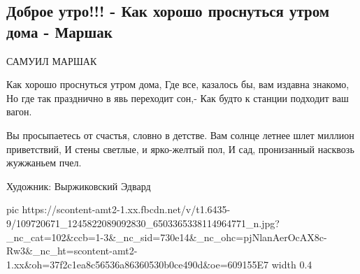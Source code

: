  
 
 
 
 

\subsection{Доброе утро!!! - Как хорошо проснуться утром дома - Маршак}
\label{sec:20_07_2020.fb.maslov_evgenij.1.marshak_dom_stihi}

САМУИЛ МАРШАК 

Как хорошо проснуться утром дома, 
Где все, казалось бы, вам издавна знакомо, 
Но где так празднично в явь переходит сон,- 
Как будто к станции подходит ваш вагон. 

Вы просыпаетесь от счастья, словно в детстве. 
Вам солнце летнее шлет миллион приветствий, 
И стены светлые, и ярко-желтый пол, 
И сад, пронизанный насквозь жужжаньем пчел. 

Художник: Выржиковский Эдвард

\ifcmt
  pic https://scontent-amt2-1.xx.fbcdn.net/v/t1.6435-9/109720671_1245822089092830_6503365338114964771_n.jpg?_nc_cat=102&ccb=1-3&_nc_sid=730e14&_nc_ohc=pjNlanAerOcAX8c-Rw3&_nc_ht=scontent-amt2-1.xx&oh=37f2c1ea8c56536a86360530b0ce490d&oe=609155E7
  width 0.4
\fi

